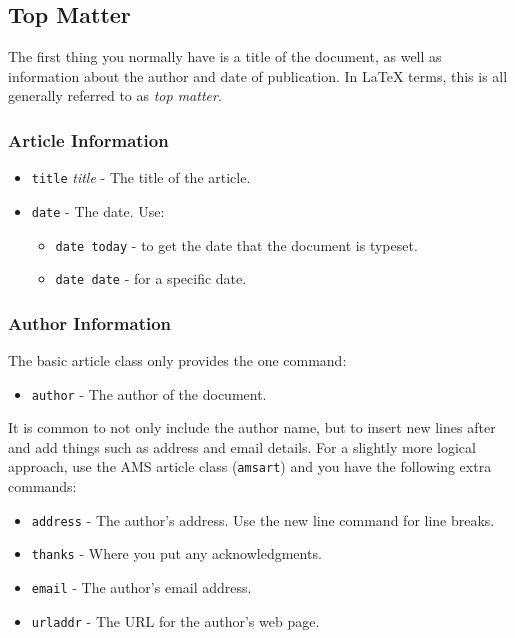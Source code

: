 \documentclass{article}
\begin{document}
\subsection{Top Matter}
The first thing you normally have is a title of the document, as well as
information about the author and date of publication.  In \LaTeX{} terms,
this is all generally referred to as \emph{top matter}.

\subsubsection{Article Information}
\begin{itemize}
	\item \texttt{title} \emph{title} - The title of the article.
	\item \texttt{date} - The date. Use:
		\begin{itemize}
			\item \texttt{date today} - to get the
			date that the document is typeset.
			\item \texttt{date date} - for a  %
			specific date.

		\end{itemize}
\end{itemize}

\subsubsection{Author Information}
The basic article class only provides the one command:
\begin{itemize}
	\item \texttt{author} - The author of the document.
\end{itemize}

It is common to not only include the author name, but to insert new
lines after and add things such
as address and email details.  For a slightly more logical approach, use
the AMS article class (\texttt{amsart}) and you have the following extra
commands:
\begin{itemize}
	\item \texttt{address} - The author's address.  Use
	the new line command for
	line breaks.
	\item \texttt{thanks} - Where you put any acknowledgments.
	\item \texttt{email} - The author's email address.
	\item \texttt{urladdr} - The URL for the author's web page.
\end{itemize}
\end{document}
